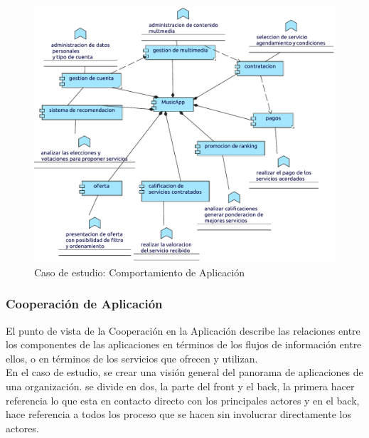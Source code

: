 \begin{figure}[h!]
	\centering
	\includegraphics[width=\linewidth]{Desarrollo/ArquitecturaEmpresarial/Aplicacion/imgs/Comportamiento.pdf}
	\caption{Caso de estudio:  Comportamiento de Aplicación}
	\label{fig:comportamiento}
\end{figure}

\newpage

\subsubsection{Cooperación de Aplicación}
El punto de vista de la Cooperación en la Aplicación describe las relaciones entre los componentes de las aplicaciones en términos de los flujos de información entre ellos, o en términos de los servicios que ofrecen y utilizan. \\

En el caso de estudio, se  crear una visión general del panorama de aplicaciones de una organización. se divide en dos, la parte del front y el back, la primera hacer referencia lo que esta en contacto directo con los principales actores y en el back, hace referencia a todos los proceso que se hacen sin involucrar directamente los actores.
